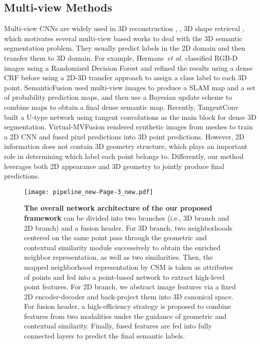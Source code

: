 \documentclass[letterpaper, 10 pt, conference]{ieeeconf}
\begin{document}
\subsection{Multi-view Methods}


Multi-view CNNs are widely used in 3D reconstruction \cite{xie2019pix2vox}, \cite{yang2020robust},
3D shape retrieval \cite{su2015multi}, \cite{he2018triplet} which motivates several multi-view based works to deal with the 3D semantic segmentation problem. They usually predict labels in the 2D domain and then transfer them to 3D domain. For example, Hermans~\emph{et al.} \cite{hermans2014dense} classified RGB-D images using a Randomized Decision Forest and refined the results using a dense CRF before using a 2D-3D transfer approach to assign a class label to each 3D point.
SemanticFusion \cite{mccormac2017semanticfusion} used multi-view images to produce a SLAM map and a set of probability prediction maps, and then use a Bayesian update scheme to combine maps to obtain a final dense semantic map. Recently, TangentConv~\cite{Tatarchenko_2018_CVPR} built a U-type network using tangent convolutions as the main block for dense 3D segmentation.
Virtual-MVFusion \cite{kundu2020virtual} rendered synthetic images from meshes to train a 2D CNN and fused pixel predictions into 3D point predictions.
However, 2D information does not contain 3D geometry structure, which plays an important role in determining which label each point belongs to. Differently, our method leverages both 2D appearance and 3D geometry to jointly produce final predictions.

\begin{figure*}[t]
\centering
\texttt{[image: pipeline\_new-Page-3\_new.pdf]}
\vspace{-8mm}
\caption{\textbf{The overall network architecture of the our proposed framework} can be divided into two branches (i.e., 3D branch and 2D branch) and a fusion header. For 3D branch, two neighborhoods centered on the same point pass through the geometric and contextual similarity module successively to obtain the enriched neighbor representation, as well as two similarities. Then, the mapped neighborhood representation by CSM is taken as attributes of points and fed into a point-based network to extract high-level point features.
For 2D branch, we abstract image  features via a fixed 2D encoder-decoder and back-project them into 3D canonical space. For fusion header, a high-efficiency strategy is proposed to combine features from two modalities under the guidance of geometric  and contextual similarity. Finally, fused features are fed into fully connected layers to predict the final semantic labels. } 
\vspace{-6mm}
\end{figure*}
\end{document}

